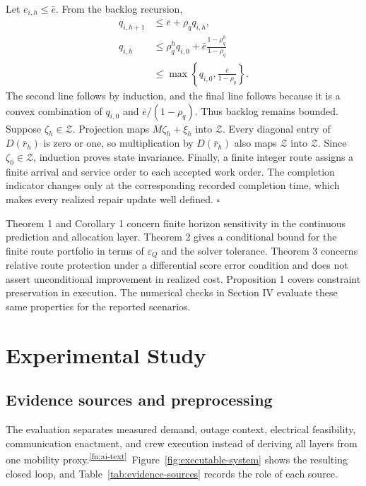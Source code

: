 \documentclass[journal]{IEEEtran}
\newcommand{\AITextRef}{\textsuperscript{\ref{fn:ai-text}}}
\begin{document}
Let $e_{i,h}\le\bar e$.  From the backlog recursion,
\begin{align}
q_{i,h+1}&\le\bar e+\rho_q q_{i,h},\\
q_{i,h}&\le \rho_q^h q_{i,0}
+\bar e\frac{1-\rho_q^h}{1-\rho_q}\\
&\le\max\left\{q_{i,0},\frac{\bar e}{1-\rho_q}\right\}.
\end{align}
The second line follows by induction, and the final line follows because it is a
convex combination of $q_{i,0}$ and $\bar e/(1-\rho_q)$.  Thus backlog remains
bounded.  Suppose $\zeta_h\in\mathcal Z$.  Projection maps
$M\zeta_h+\xi_h$ into $\mathcal Z$.  Every diagonal entry of $D(\bar r_h)$ is
zero or one, so multiplication by $D(\bar r_h)$ also maps $\mathcal Z$ into
$\mathcal Z$.  Since $\zeta_0\in\mathcal Z$, induction proves state invariance.
Finally, a finite integer route assigns a finite arrival and service order to
each accepted work order.  The completion indicator changes only at the
corresponding recorded completion time, which makes every realized repair update
well defined.  \hfill $\square$

Theorem 1 and Corollary 1 concern finite horizon sensitivity in the continuous
prediction and allocation layer.  Theorem 2 gives a conditional bound for the
finite route portfolio in terms of $\varepsilon_Q$ and the solver tolerance.
Theorem 3 concerns relative route protection under a differential score error
condition and does not assert unconditional improvement in realized cost.
Proposition 1 covers constraint preservation in execution.  The numerical
checks in Section IV evaluate these same properties for the reported scenarios.

\section{Experimental Study}
\label{sec:experiments}

\subsection{Evidence sources and preprocessing}
\label{sec:data}

The evaluation separates measured demand, outage context, electrical
feasibility, communication enactment, and crew execution instead of deriving
all layers from one mobility proxy.\AITextRef\ Figure~\ref{fig:executable-system} shows
the resulting closed loop, and Table~\ref{tab:evidence-sources} records the role
of each source.
\end{document}
